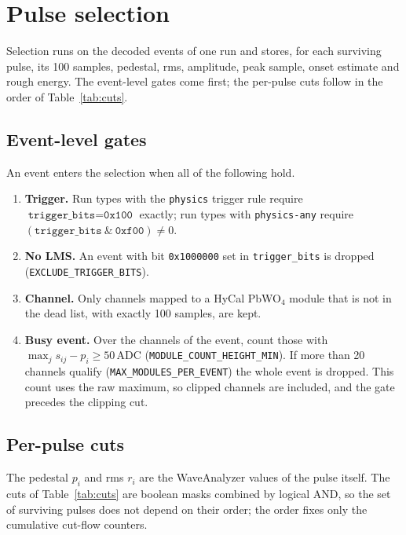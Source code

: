 \documentclass[11pt]{article}
\newcommand{\adc}{\,\mathrm{ADC}}
\newcommand{\code}[1]{\texttt{#1}}
\begin{document}
\section{Pulse selection}
\label{sec:selection}

Selection runs on the decoded events of one run and stores, for each surviving pulse, its 100 samples, pedestal, rms, amplitude, peak sample, onset estimate and rough energy. The event-level gates come first; the per-pulse cuts follow in the order of Table~\ref{tab:cuts}.

\subsection{Event-level gates}

An event enters the selection when all of the following hold.
\begin{enumerate}
\item \textbf{Trigger.} Run types with the \code{physics} trigger rule require $\code{trigger\_bits} = \code{0x100}$ exactly; run types with \code{physics-any} require $(\code{trigger\_bits}\ \&\ \code{0xf00}) \neq 0$.
\item \textbf{No LMS.} An event with bit \code{0x1000000} set in \code{trigger\_bits} is dropped (\code{EXCLUDE\_TRIGGER\_BITS}).
\item \textbf{Channel.} Only channels mapped to a HyCal PbWO$_4$ module that is not in the dead list, with exactly 100 samples, are kept.
\item \textbf{Busy event.} Over the channels of the event, count those with $\max_j s_{ij} - p_i \ge 50\adc$ (\code{MODULE\_COUNT\_HEIGHT\_MIN}). If more than 20 channels qualify (\code{MAX\_MODULES\_PER\_EVENT}) the whole event is dropped. This count uses the raw maximum, so clipped channels are included, and the gate precedes the clipping cut.
\end{enumerate}

\subsection{Per-pulse cuts}

The pedestal $p_i$ and rms $r_i$ are the WaveAnalyzer values of the pulse itself. The cuts of Table~\ref{tab:cuts} are boolean masks combined by logical AND, so the set of surviving pulses does not depend on their order; the order fixes only the cumulative cut-flow counters.
\end{document}
